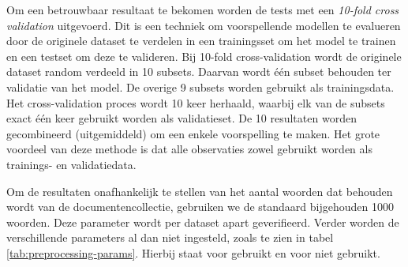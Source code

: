 Om een betrouwbaar resultaat te bekomen worden de tests met een \textit{10-fold cross validation}\label{10-fold-cv} uitgevoerd. Dit is een techniek om voorspellende modellen te evalueren door de originele dataset te verdelen in een trainingsset om het model te trainen en een testset om deze te valideren. Bij 10-fold cross-validation\label{cross-val} wordt de originele dataset random verdeeld in 10 subsets. Daarvan wordt \'e\'en subset behouden ter validatie van het model. De overige 9 subsets worden gebruikt als trainingsdata. Het cross-validation proces wordt 10 keer herhaald, waarbij elk van de subsets exact \'e\'en keer gebruikt worden als validatieset. De 10 resultaten worden gecombineerd (uitgemiddeld) om een enkele voorspelling te maken. Het grote voordeel van deze methode is dat alle observaties zowel gebruikt worden als trainings- en validatiedata. 

Om de resultaten onafhankelijk te stellen van het aantal woorden dat behouden wordt van de documentencollectie, gebruiken we de standaard bijgehouden 1000 woorden. Deze parameter wordt per dataset apart geverifieerd. Verder worden de verschillende parameters al dan niet ingesteld, zoals te zien in tabel \ref{tab:preprocessing-params}. Hierbij staat  voor gebruikt en  voor niet gebruikt. 

